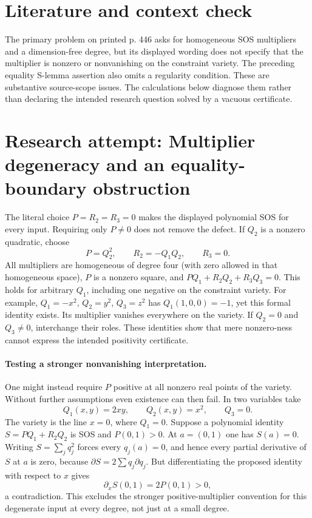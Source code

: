 \documentclass[11pt]{article}
\begin{document}
\section{Literature and context check}
The primary problem on printed p. 446 asks for homogeneous SOS multipliers and a dimension-free degree, but its displayed wording does not specify that the multiplier is nonzero or nonvanishing on the constraint variety. The preceding equality S-lemma assertion also omits a regularity condition. These are substantive source-scope issues. The calculations below diagnose them rather than declaring the intended research question solved by a vacuous certificate.
\section{Research attempt: Multiplier degeneracy and an equality-boundary obstruction}

The literal choice $P=R_2=R_3=0$ makes the displayed polynomial SOS for every input. Requiring only $P\ne0$ does not remove the defect. If $Q_2$ is a nonzero quadratic, choose
\[
P=Q_2^2,\qquad R_2=-Q_1Q_2,\qquad R_3=0.
\]
All multipliers are homogeneous of degree four (with zero allowed in that homogeneous space), $P$ is a nonzero square, and $PQ_1+R_2Q_2+R_3Q_3=0$. This holds for arbitrary $Q_1$, including one negative on the constraint variety. For example, $Q_1=-x^2$, $Q_2=y^2$, $Q_3=z^2$ has $Q_1(1,0,0)=-1$, yet this formal identity exists. Its multiplier vanishes everywhere on the variety. If $Q_2=0$ and $Q_3\ne0$, interchange their roles. These identities show that mere nonzero-ness cannot express the intended positivity certificate.

\paragraph{Testing a stronger nonvanishing interpretation.}
One might instead require $P$ positive at all nonzero real points of the variety. Without further assumptions even existence can then fail. In two variables take
\[
Q_1(x,y)=2xy,\qquad Q_2(x,y)=x^2,\qquad Q_3=0.
\]
The variety is the line $x=0$, where $Q_1=0$. Suppose a polynomial identity $S=PQ_1+R_2Q_2$ is SOS and $P(0,1)>0$. At $a=(0,1)$ one has $S(a)=0$. Writing $S=\sum_j q_j^2$ forces every $q_j(a)=0$, and hence every partial derivative of $S$ at $a$ is zero, because $\partial S=2\sum q_j\partial q_j$. But differentiating the proposed identity with respect to $x$ gives
\[
\partial_x S(0,1)=2P(0,1)>0,
\]
a contradiction. This excludes the stronger positive-multiplier convention for this degenerate input at every degree, not just at a small degree.
\end{document}
